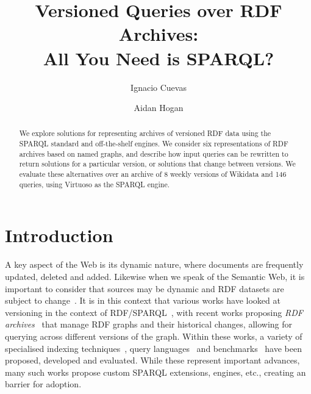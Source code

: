 \documentclass{llncs}
\begin{document}
\title{Versioned Queries over RDF Archives:\\All You Need is SPARQL?}

\author{Ignacio Cuevas \and Aidan Hogan}

\maketitle

\begin{abstract}
We explore solutions for representing archives of versioned RDF data using the SPARQL standard and off-the-shelf engines. We consider six representations of RDF archives based on named graphs, and describe how input queries can be rewritten to return solutions for a particular version, or solutions that change between versions. We evaluate these alternatives over an archive of 8 weekly versions of Wikidata and 146 queries, using Virtuoso as the SPARQL engine.
\end{abstract}


\section{Introduction}

A key aspect of the Web is its dynamic nature, where documents are frequently updated, deleted and added. Likewise when we speak of the Semantic Web, it is important to consider that sources may be dynamic and RDF datasets are subject to change~\cite{KaferAUOH13}. It is in this context that various works have looked at versioning in the context of RDF/SPARQL~\cite{VolkelG06,TappoletB09,Grandi10,GraubeHU14,KhuranaD16}, with recent works proposing \textit{RDF archives}~\cite{FernandezPU15,Cerdeira-PenaFF16,BahriLA18,FernandezUPK19,TaelmanSHMV19} that manage RDF graphs and their historical changes, allowing for querying across different versions of the graph. Within these works, a variety of specialised indexing techniques~\cite{Cerdeira-PenaFF16,BahriLA18,TaelmanSHMV19}, query languages~\cite{TappoletB09} and benchmarks~\cite{KotsevMPEFK16,FernandezUPK19} have been proposed, developed and evaluated. While these represent important advances, many such works propose custom SPARQL extensions, engines, etc., creating an barrier for adoption.
\end{document}
